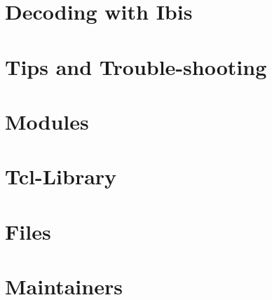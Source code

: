 \documentclass[a4paper,twoside]{book}
\begin{document}





\chapter{Decoding with Ibis} \label{sec:ibis}





\chapter{Tips and Trouble-shooting} \label{sec:troubleshooting}




\chapter{Modules} \label{sec:modules}




\chapter{Tcl-Library} \label{sec:lib}




\chapter{Files} \label{sec:files}




\chapter{Maintainers} \label{sec:people}
\end{document}
